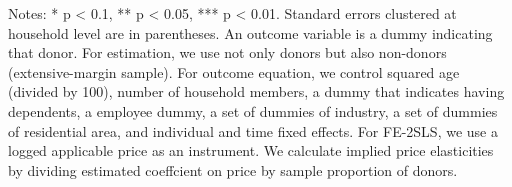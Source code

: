 \begin{table}
\begin{threeparttable}
\begin{tablenotes}
\item Notes: * p < 0.1, ** p < 0.05, *** p < 0.01. Standard errors clustered at household level are in parentheses. An outcome variable is a dummy indicating that donor. For estimation, we use not only donors but also non-donors (extensive-margin sample). For outcome equation, we control squared age (divided by 100), number of household members, a dummy that indicates having dependents, a employee dummy, a set of dummies of industry, a set of dummies of residential area, and individual and time fixed effects. For FE-2SLS, we use a logged applicable price as an instrument. We calculate implied price elasticities by dividing estimated coeffcient on price by sample proportion of donors.
\end{tablenotes}
\end{threeparttable}
\end{table}
